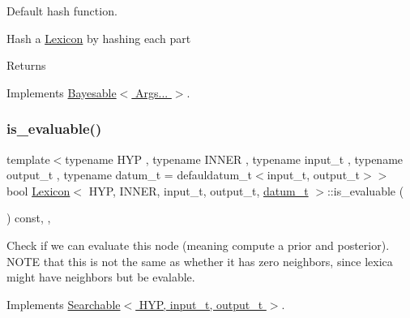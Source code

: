 Default hash function. 

Hash a \hyperlink{class_lexicon}{Lexicon} by hashing each part \begin{DoxyReturn}{Returns}

\end{DoxyReturn}


Implements \hyperlink{class_bayesable_a26f6d55e7526ebd897cbb27c757b611b}{Bayesable$<$ Args... $>$}.

\mbox{\label{class_lexicon_ab9fcefbd8598a5401a39bd59e8043db9}} 
\subsubsection{\texorpdfstring{is\+\_\+evaluable()}{is\_evaluable()}}
{\footnotesize\ttfamily template$<$typename H\+YP , typename I\+N\+N\+ER , typename input\+\_\+t , typename output\+\_\+t , typename datum\+\_\+t  = defauldatum\+\_\+t$<$input\+\_\+t, output\+\_\+t$>$$>$ \\
bool \hyperlink{class_lexicon}{Lexicon}$<$ H\+YP, I\+N\+N\+ER, input\+\_\+t, output\+\_\+t, \hyperlink{class_bayesable_a9f1a6c0cd7855550fa10b1a8f13a5867}{datum\+\_\+t} $>$\+::is\+\_\+evaluable (\begin{DoxyParamCaption}{ }\end{DoxyParamCaption}) const\hspace{0.3cm}{\ttfamily [inline]}, {\ttfamily [override]}, {\ttfamily [virtual]}}



Check if we can evaluate this node (meaning compute a prior and posterior). N\+O\+TE that this is not the same as whether it has zero neighbors, since lexica might have neighbors but be evalable. 



Implements \hyperlink{class_searchable_a23786e95730117c3cc4b90e010494a1e}{Searchable$<$ H\+Y\+P, input\+\_\+t, output\+\_\+t $>$}.

\mbox{\label{class_lexicon_ad237c78e3435223f344d153da3baba9b}} 
